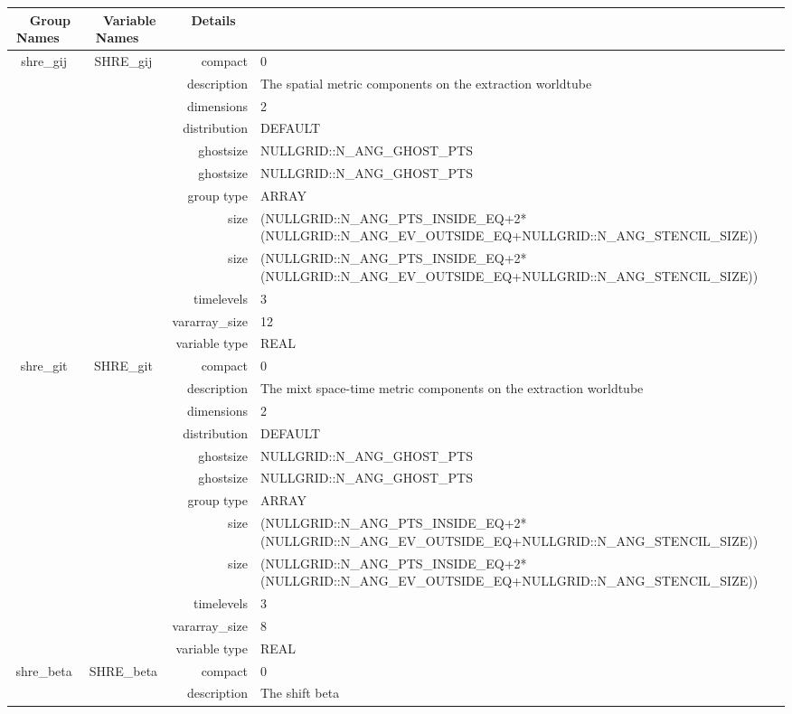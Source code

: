 \begin{tabular*}{150mm}{|c|c@{\extracolsep{\fill}}|rl|} \hline 
~ {\bf Group Names} ~ & ~ {\bf Variable Names} ~  &{\bf Details} ~ & ~\\ 
\hline 
shre\_gij & SHRE\_gij & compact & 0 \\ 
 &  & description & The spatial metric components on the extraction worldtube \\ 
 &  & dimensions & 2 \\ 
 &  & distribution & DEFAULT \\ 
 &  & ghostsize & NULLGRID::N\_ANG\_GHOST\_PTS \\ 
& ~ & ghostsize & NULLGRID::N\_ANG\_GHOST\_PTS \\ 
 &  & group type & ARRAY \\ 
 &  & size & (NULLGRID::N\_ANG\_PTS\_INSIDE\_EQ+2*(NULLGRID::N\_ANG\_EV\_OUTSIDE\_EQ+NULLGRID::N\_ANG\_STENCIL\_SIZE)) \\ 
& ~ & size & (NULLGRID::N\_ANG\_PTS\_INSIDE\_EQ+2*(NULLGRID::N\_ANG\_EV\_OUTSIDE\_EQ+NULLGRID::N\_ANG\_STENCIL\_SIZE)) \\ 
 &  & timelevels & 3 \\ 
 &  & vararray\_size & 12 \\ 
 &  & variable type & REAL \\ 
\hline 
shre\_git & SHRE\_git & compact & 0 \\ 
 &  & description & The mixt space-time metric components on the extraction worldtube \\ 
 &  & dimensions & 2 \\ 
 &  & distribution & DEFAULT \\ 
 &  & ghostsize & NULLGRID::N\_ANG\_GHOST\_PTS \\ 
& ~ & ghostsize & NULLGRID::N\_ANG\_GHOST\_PTS \\ 
 &  & group type & ARRAY \\ 
 &  & size & (NULLGRID::N\_ANG\_PTS\_INSIDE\_EQ+2*(NULLGRID::N\_ANG\_EV\_OUTSIDE\_EQ+NULLGRID::N\_ANG\_STENCIL\_SIZE)) \\ 
& ~ & size & (NULLGRID::N\_ANG\_PTS\_INSIDE\_EQ+2*(NULLGRID::N\_ANG\_EV\_OUTSIDE\_EQ+NULLGRID::N\_ANG\_STENCIL\_SIZE)) \\ 
 &  & timelevels & 3 \\ 
 &  & vararray\_size & 8 \\ 
 &  & variable type & REAL \\ 
\hline 
shre\_beta & SHRE\_beta & compact & 0 \\ 
 &  & description & The shift beta \\ 

\end{tabular*}
